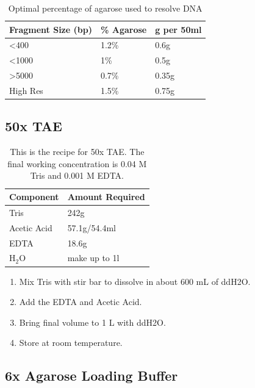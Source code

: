 \documentclass{tufte-book} %
\begin{document}
\begin{table}[ht]
  \centering
  \selectfont
  \begin{tabular}{lll}
    \toprule
    Fragment Size (bp) & \% Agarose & g per 50ml \\
    \midrule
    <400 			& 1.2\% 	& 0.6g	\\
    <1000 			& 1\% 	& 0.5g	\\
    >5000 			& 0.7\% 	& 0.35g 	\\
   High Res 		& 1.5\% 	& 0.75g	\\
    \bottomrule
  \end{tabular}
  \caption{Optimal percentage of agarose used to resolve DNA}
  \label{tab:agarose}
\end{table}

\newpage
\subsection{50x TAE}

\begin{table}[ht]
  \centering
  \selectfont
  \begin{tabular}{ll}
    \toprule
    Component & Amount  Required\\
    \midrule
   Tris 			& 242g 	\\
   Acetic Acid		& 57.1g/54.4ml 	\\
   EDTA  	& 18.6g 	\\
   H$_{2}$O 		& make up to 1l 	\\
    \bottomrule
  \end{tabular}
  \caption{This is the recipe for 50x TAE. The final working concentration is 0.04 M Tris and 0.001 M EDTA.}
  \label{tab:TAE}
\end{table}

\begin{enumerate}
\item Mix Tris with stir bar to dissolve in about 600 mL of ddH2O. 
\item Add the EDTA and Acetic Acid.
\item Bring final volume to 1 L with ddH2O.
\item Store at room temperature.
\end{enumerate}

\subsection{6x Agarose Loading Buffer}
\end{document}
